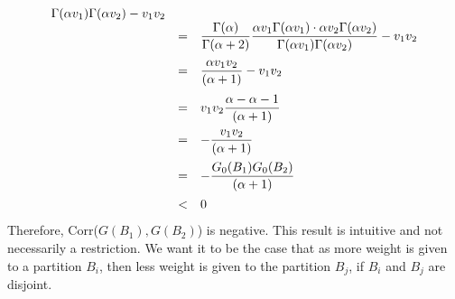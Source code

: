 \documentclass{article}
\def\beginmyfig{\begin{figure}[htbp]\begin{center}}
\def\endmyfig{\end{center}\end{figure}}
\def\ds{\displaystyle}
\begin{document}
\[\begin{array}{rcl}
                            {\Gamma(\alpha v_1)\Gamma(\alpha v_2)} - v_1 v_2\\
                            \vspace{.7em}
                        &=& \ds\frac{\Gamma(\alpha)}{\Gamma(\alpha+2)}
                            \ds\frac{\alpha v_1\Gamma(\alpha v_1) \cdot \alpha v_2\Gamma(\alpha v_2)}
                            {\Gamma(\alpha v_1)\Gamma(\alpha v_2)} - v_1 v_2\\
                            \vspace{.7em}
                        &=& \ds\frac{\alpha v_1 v_2}{(\alpha +1)} - v_1 v_2 \\
                            \vspace{.5em}
                        &=& v_1 v_2 \ds\frac{\alpha - \alpha - 1}{(\alpha +1)} \\
                            \vspace{.5em}
                        &=& -\ds\frac{v_1 v_2 }{(\alpha +1)} \\
                            \vspace{.5em}
                        &=& -\ds\frac{G_0(B_1) G_0(B_2) }{(\alpha +1)} \\
                        &<& 0 \\
  \end{array}
\]
Therefore, Corr($G(B_1),G(B_2)$) is negative. This result is intuitive and not necessarily a restriction.
We want it to be the case that as more weight is given to a partition $B_i$, then less weight is
given to the partition $B_j$, if $B_i$ and $B_j$ are disjoint.




\end{document}
